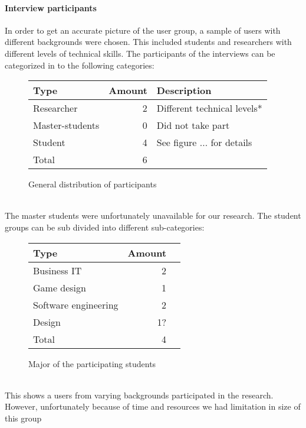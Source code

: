 \documentclass[conference]{IEEEtran}
\begin{document}
		\paragraph{Interview participants}
			In order to get an accurate picture of the user group, a sample of users with different backgrounds were chosen. This included students and researchers with different levels of technical skills. The participants of the interviews can be categorized in to the following categories:
			\begin{figure}[ht]
				\centering
				\begin{tabular}{ | l | r | l | }
					\hline
					Type			& Amount	& Description \\ \hline \hline
					Researcher		& 2			& Different technical levels* \\ \hline
					Master-students	& 0			& Did not take part \\ \hline \hline
					Student			& 4			& See figure ... for details \\ \hline \hline
					Total			& 6			& \\ \hline
				\end{tabular}
				\caption{General distribution of participants}
			\end{figure}\\
			The master students were unfortunately unavailable for our research. The student groups can be sub divided into different sub-categories:
			\begin{figure}[ht]
				\centering
				\begin{tabular}{ | l | r | l | }
					\hline
					Type					& Amount \\ \hline \hline
					Business IT				& 2 \\ \hline
					Game design				& 1 \\ \hline
					Software engineering	& 2 \\ \hline
					Design					& 1? \\ \hline \hline
					Total					& 4 \\ \hline
				\end{tabular}
				\caption{Major of the participating students}
			\end{figure} \\
			This shows a users from varying backgrounds participated in the research. However, unfortunately because of time and resources we had limitation in size of this group
\end{document}

